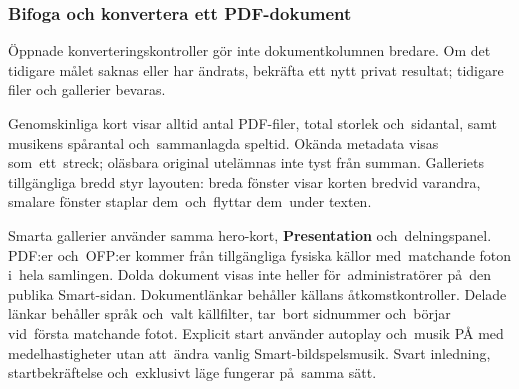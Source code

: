 \documentclass[11pt,a4paper]{article}
\newcommand{\ui}[1]{\textbf{#1}}
\begin{document}
\subsubsection{Bifoga och konvertera ett PDF-dokument}
Öppnade konverteringskontroller gör inte dokumentkolumnen bredare. Om det
tidigare målet saknas eller har ändrats, bekräfta ett nytt privat resultat;
tidigare filer och gallerier bevaras.

Genomskinliga kort visar alltid antal PDF-filer, total storlek och~sidantal,
samt musikens spårantal och~sammanlagda speltid. Okända metadata visas
som~ett~streck; oläsbara original utelämnas inte tyst från summan.
Galleriets tillgängliga bredd styr layouten: breda fönster visar korten
bredvid varandra, smalare fönster staplar dem~och~flyttar dem~under texten.

Smarta gallerier använder samma hero-kort, \ui{Presentation} och~delningspanel.
PDF:er och~OFP:er kommer från tillgängliga fysiska källor med~matchande foton
i~hela samlingen. Dolda dokument visas inte heller för~administratörer på~den
publika Smart-sidan. Dokumentlänkar behåller källans åtkomstkontroller.
Delade länkar behåller språk och~valt källfilter, tar~bort sidnummer och~börjar
vid~första matchande fotot. Explicit start använder autoplay och~musik PÅ med
medelhastigheter utan att~ändra vanlig Smart-bildspelsmusik. Svart inledning,
startbekräftelse och~exklusivt läge fungerar på~samma sätt.
\end{document}
